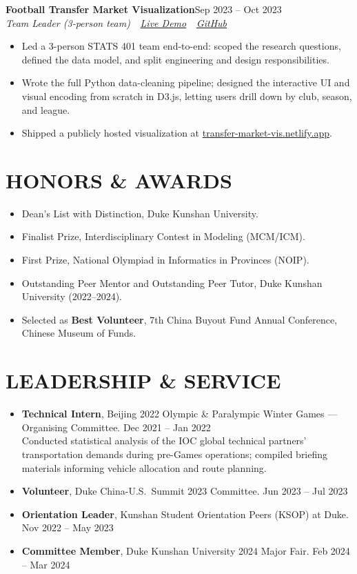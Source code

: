 \documentclass[11pt,letterpaper]{article}
\newcommand{\entry}[4]{%
  \noindent\textbf{\color{ink}#1}\hfill{\color{soft}\small #3}\\[1pt]%
  \textit{\color{muted}#2}\hfill\textit{\color{soft}\small #4}%
  \vspace{2pt}%
}
\begin{document}
\vspace{4pt}
\entry{Football Transfer Market Visualization}{Team Leader (3-person team) \,\textbar\, \href{https://transfer-market-vis.netlify.app/}{Live Demo} \,\textbar\, \href{https://github.com/cedricshan/Football-Transfer-Market-Visualization}{GitHub}}{Sep 2023 -- Oct 2023}{}
\begin{itemize}
  \item Led a 3-person STATS 401 team end-to-end: scoped the research questions, defined the data model, and split engineering and design responsibilities.
  \item Wrote the full Python data-cleaning pipeline; designed the interactive UI and visual encoding from scratch in D3.js, letting users drill down by club, season, and league.
  \item Shipped a publicly hosted visualization at \href{https://transfer-market-vis.netlify.app/}{transfer-market-vis.netlify.app}.
\end{itemize}

\section{HONORS \& AWARDS}
\begin{itemize}
  \item Dean's List with Distinction, Duke Kunshan University.
  \item Finalist Prize, Interdisciplinary Contest in Modeling (MCM/ICM).
  \item First Prize, National Olympiad in Informatics in Provinces (NOIP).
  \item Outstanding Peer Mentor and Outstanding Peer Tutor, Duke Kunshan University (2022--2024).
  \item Selected as \textbf{Best Volunteer}, 7th China Buyout Fund Annual Conference, Chinese Museum of Funds.
\end{itemize}

\section{LEADERSHIP \& SERVICE}
\begin{itemize}
  \item \textbf{Technical Intern}, Beijing 2022 Olympic \& Paralympic Winter Games --- Organising Committee. \hfill {\small\color{soft} Dec 2021 -- Jan 2022}\\
  Conducted statistical analysis of the IOC global technical partners' transportation demands during pre-Games operations; compiled briefing materials informing vehicle allocation and route planning.
  \item \textbf{Volunteer}, Duke China-U.S.\ Summit 2023 Committee. \hfill {\small\color{soft} Jun 2023 -- Jul 2023}
  \item \textbf{Orientation Leader}, Kunshan Student Orientation Peers (KSOP) at Duke. \hfill {\small\color{soft} Nov 2022 -- May 2023}
  \item \textbf{Committee Member}, Duke Kunshan University 2024 Major Fair. \hfill {\small\color{soft} Feb 2024 -- Mar 2024}
\end{itemize}
\end{document}
